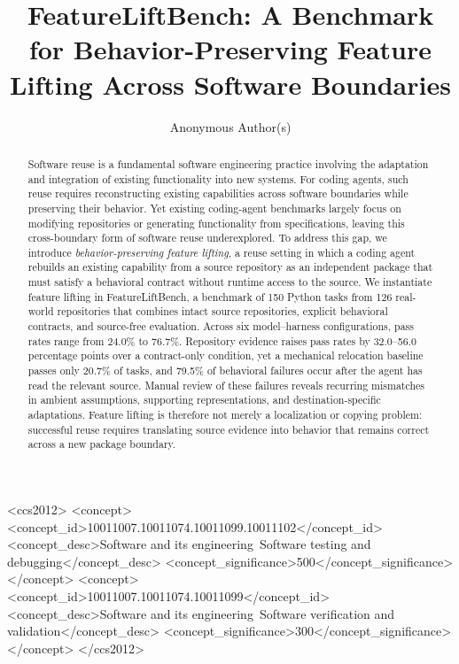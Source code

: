 \documentclass[acmsmall,screen,review,anonymous]{acmart}
\begin{document}
\title{FeatureLiftBench: A Benchmark for Behavior-Preserving Feature Lifting Across Software Boundaries}
\author{Anonymous Author(s)}
\begin{abstract}
Software reuse is a fundamental software engineering practice involving the adaptation and integration of existing functionality into new systems. For coding agents, such reuse requires reconstructing existing capabilities across software boundaries while preserving their behavior.
Yet existing coding-agent benchmarks largely focus on
modifying repositories or generating functionality from specifications, leaving this cross-boundary form of software reuse underexplored.
To address this gap, we introduce \emph{behavior-preserving feature lifting}, a reuse setting in which a coding agent rebuilds an existing capability from a source repository as an independent package that must satisfy a behavioral contract without runtime access to the source.
We instantiate feature lifting in FeatureLiftBench, a benchmark of 150 Python tasks from 126 real-world repositories that combines intact source repositories, explicit behavioral contracts, and source-free evaluation. Across six model--harness configurations, pass rates range from 24.0\% to 76.7\%.
Repository evidence raises pass rates by 32.0--56.0 percentage points over a contract-only condition, yet a mechanical relocation baseline passes only 20.7\% of tasks, and 79.5\% of behavioral failures occur after the agent has read the relevant source.
Manual review of these failures reveals recurring mismatches in ambient assumptions, supporting representations, and destination-specific adaptations. Feature lifting is therefore not merely a localization or copying problem: successful reuse requires translating source evidence into behavior that remains correct across a new package boundary.
\end{abstract}

\begin{CCSXML}
<ccs2012>
 <concept><concept_id>10011007.10011074.10011099.10011102</concept_id>
 <concept_desc>Software and its engineering~Software testing and debugging</concept_desc>
 <concept_significance>500</concept_significance></concept>
 <concept><concept_id>10011007.10011074.10011099</concept_id>
 <concept_desc>Software and its engineering~Software verification and validation</concept_desc>
 <concept_significance>300</concept_significance></concept>
</ccs2012>
\end{CCSXML}
\maketitle
\end{document}
